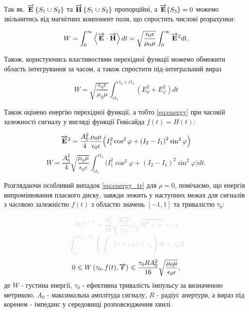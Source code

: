 Так як, $ \overrightarrow{\mathbf E}\left\{S_1 \cup S_2\right\} $ та  
$ \overrightarrow{\mathbf H}\left\{S_1 \cup S_2 \right\}$ пропорційні, 
а $ \overrightarrow{\mathbf E}\{S_3\} = 0 $ можемо звільнитись від магнітних компонент 
поля, що спростить числові розрахунки:

\begin{equation}
W = \int_0^\infty \left< \overrightarrow{\mathbf E} \cdot \overrightarrow{\mathbf H} \right> dt =
\sqrt{\frac{\epsilon_0 \epsilon}{\mu_0 \mu}} \int_0^\infty \overrightarrow{\mathbf E}^2 dt.
\end{equation}

Також, користуючись властивостями перехідної функції можемо обмежити
область інтегрування за часом, а також спростити під-інтегральний вираз

\begin{equation} \label{eq:energy}
W = \sqrt{\frac{\epsilon_0 \epsilon}{\mu_0 \mu}}
\int_{ct_1}^{c\tau_0+ct_3} \left( E_\rho^2 + E_\varphi^2 \right) dt
\end{equation}

Також оцінено енергію перехідної функції, а тобто \ref{eq:energy} при 
часовій залежності сигналу у вигляді функції Гевісайда $ f(t) = H(t) $:

\textcolor{lightgray}{ \begin{equation*} \begin{aligned}
\overrightarrow{\mathbf E}^2 = \frac{A_0^2}{4} \frac{\mu_0 \mu}{\epsilon_0 \epsilon}
\Big( I_1^2 \cos^2 \varphi + \left( I_2 - I_1 \right)^2 \sin^2 \varphi \Big)
\end{aligned} \end{equation*} }
%
\begin{equation} \label{eq:energy_tr}
W = \frac{A_0^2}{4} \sqrt{\frac{\mu_0 \mu}{\epsilon_0 \epsilon}}
\int_{ct_1}^{ct_3}  \Big( I_1^2 \cos^2 \varphi + 
\left( I_2 - I_1 \right)^2 \sin^2 \varphi \Big) dt.
\end{equation}

Розглядаючи особливий випадок \ref{eq:energy_tr} для $ \rho = 0 $, помічаємо,
що енергія випромінювання плаского диску, завжди лежить у наступних межах для 
сигналів з часовою залежністю $ f(t) $ з областю значень 
$ \left[ -1, 1 \right] $ та тривалістю $ \tau_0 $:

\textcolor{lightgray}{ \begin{equation*}
\left. W \right|^{\rho=0} = 
\frac{A_0^2}{16} \sqrt{\frac{\mu_0 \mu}{\epsilon_0 \epsilon}}
\Big( \sqrt{R^2+z^2} - z \Big)
\end{equation*} }
%
\textcolor{lightgray}{ \begin{equation*}
\int_{ct_1}^{c\tau_0+ct_3} 
\left( \int_0^t f(\tau) d \tau < \tau_0 \right) dt < \tau_0 R
\end{equation*} }
%
\begin{equation}
0 \leqslant W \left( \tau_0, f(t), \overrightarrow{\mathbf r} \right) \leqslant \frac{\tau_0 R A_0^2}{16} 
\sqrt{\frac{\mu_0 \mu}{\epsilon_0 \epsilon}},
\end{equation}
%
де $ W $ - густина енергії, $ \tau_0 $ - ефективна тривалість імпульсу за 
визначеною метрикою, $ A_0 $ - максимальна амплітуда сигналу, $ R $ - 
радіус апертури, а вираз під коренем - імпеданс у середовищі розповсюдження 
хвилі.

